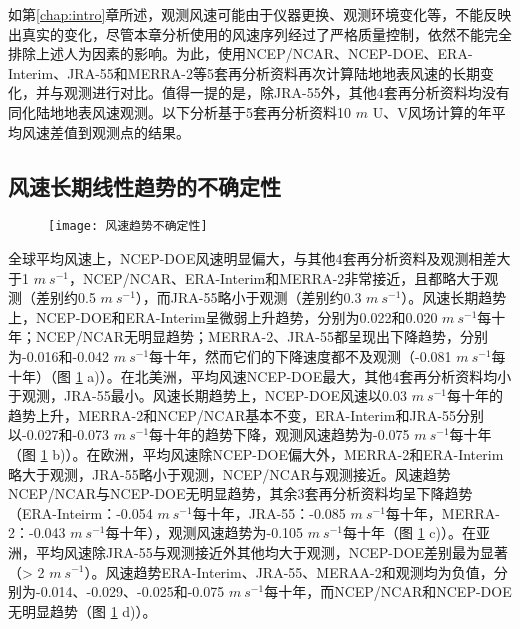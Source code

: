 如第\ref{chap:intro}章所述，观测风速可能由于仪器更换、观测环境变化等，不能反映出真实的变化，尽管本章分析使用的风速序列经过了严格质量控制，依然不能完全排除上述人为因素的影响。为此，使用NCEP/NCAR、NCEP-DOE、ERA-Interim、JRA-55和MERRA-2等5套再分析资料再次计算陆地地表风速的长期变化，并与观测进行对比。值得一提的是，除JRA-55外，其他4套再分析资料均没有同化陆地地表风速观测。以下分析基于5套再分析资料10 $m$ U、V风场计算的年平均风速差值到观测点的结果。

\subsection{风速长期线性趋势的不确定性}

\begin{figure}[!t]
    \centering
    \texttt{[image: 风速趋势不确定性]}
    \label{fig:uncertaintywindtrend}
\end{figure}

全球平均风速上，NCEP-DOE风速明显偏大，与其他4套再分析资料及观测相差大于1 $m ~ s^{-1}$，NCEP/NCAR、ERA-Interim和MERRA-2非常接近，且都略大于观测（差别约0.5 $m ~ s^{-1}$），而JRA-55略小于观测（差别约0.3 $m ~ s^{-1}$）。风速长期趋势上，NCEP-DOE和ERA-Interim呈微弱上升趋势，分别为0.022和0.020 $m ~ s^{-1}$每十年；NCEP/NCAR无明显趋势；MERRA-2、JRA-55都呈现出下降趋势，分别为-0.016和-0.042 $m ~ s^{-1}$每十年，然而它们的下降速度都不及观测（-0.081 $m ~ s^{-1}$每十年）（图 \ref{fig:uncertaintywindtrend} a)）。在北美洲，平均风速NCEP-DOE最大，其他4套再分析资料均小于观测，JRA-55最小。风速长期趋势上，NCEP-DOE风速以0.03 $m ~ s^{-1}$每十年的趋势上升，MERRA-2和NCEP/NCAR基本不变，ERA-Interim和JRA-55分别以-0.027和-0.073 $m ~ s^{-1}$每十年的趋势下降，观测风速趋势为-0.075 $m ~ s^{-1}$每十年（图 \ref{fig:uncertaintywindtrend} b)）。在欧洲，平均风速除NCEP-DOE偏大外，MERRA-2和ERA-Interim略大于观测，JRA-55略小于观测，NCEP/NCAR与观测接近。风速趋势NCEP/NCAR与NCEP-DOE无明显趋势，其余3套再分析资料均呈下降趋势（ERA-Inteirm：-0.054 $m ~ s^{-1}$每十年，JRA-55：-0.085 $m ~ s^{-1}$每十年，MERRA-2：-0.043 $m ~ s^{-1}$每十年），观测风速趋势为-0.105 $m ~ s^{-1}$每十年（图 \ref{fig:uncertaintywindtrend} c)）。在亚洲，平均风速除JRA-55与观测接近外其他均大于观测，NCEP-DOE差别最为显著（> 2 $m ~ s^{-1}$）。风速趋势ERA-Interim、JRA-55、MERAA-2和观测均为负值，分别为-0.014、-0.029、-0.025和-0.075 $m ~ s^{-1}$每十年，而NCEP/NCAR和NCEP-DOE无明显趋势（图 \ref{fig:uncertaintywindtrend} d)）。


